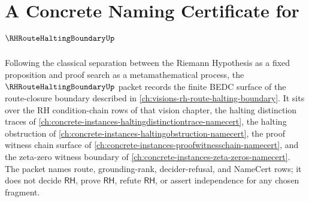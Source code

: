 \chapter{A Concrete Naming Certificate for $\RHRouteHaltingBoundaryUp$}
\label{ch:concrete-instances-rh-route-halting-boundary-namecert}

Following the classical separation between the Riemann Hypothesis as a fixed proposition and proof search as a metamathematical process, the $\RHRouteHaltingBoundaryUp$ packet records the finite BEDC surface of the route-closure boundary described in \autoref{ch:visions-rh-route-halting-boundary}. It sits over the RH condition-chain rows of that vision chapter, the halting distinction traces of \autoref{ch:concrete-instances-haltingdistinctiontrace-namecert}, the halting obstruction of \autoref{ch:concrete-instances-haltingobstruction-namecert}, the proof witness chain surface of \autoref{ch:concrete-instances-proofwitnesschain-namecert}, and the zeta-zero witness boundary of \autoref{ch:concrete-instances-zeta-zeros-namecert}. The packet names route, grounding-rank, decider-refusal, and NameCert rows; it does not decide $\mathsf{RH}$, prove $\mathsf{RH}$, refute $\mathsf{RH}$, or assert independence for any chosen fragment.

